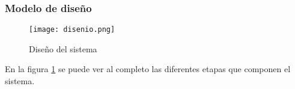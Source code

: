\subsubsection{Modelo de diseño}
\begin{figure}[ht]
    \centering
    \texttt{[image: disenio.png]}
    \caption{Diseño del sistema}
    \label{fig:desing}
\end{figure}

En la figura \ref{fig:desing} se puede ver al completo las diferentes etapas que componen
el sistema. 
